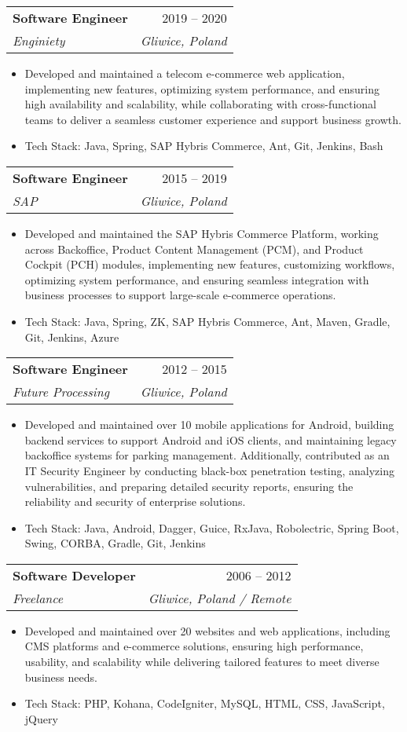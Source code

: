 \documentclass[letterpaper,11pt]{article}
\makeatletter
\newcommand{\resumeItem}[1]{
  \item\small{
    {#1 \vspace{-2pt}}
  }
}
\newcommand{\resumeSubheading}[4]{
  \vspace{-2pt}\item
    \begin{tabular*}{0.97\textwidth}[t]{l@{\extracolsep{\fill}}r}
      \textbf{#1} & #2 \\
      \textit{\small#3} & \textit{\small #4} \\
    \end{tabular*}\vspace{-7pt}
}
\newcommand{\resumeItemListStart}{\begin{itemize}}
\newcommand{\resumeItemListEnd}{\end{itemize}\vspace{-5pt}}
\makeatother
\begin{document}
    \resumeSubheading
      {Software Engineer}{2019 -- 2020}
      {Enginiety}{Gliwice, Poland}
      \resumeItemListStart
        \resumeItem{Developed and maintained a telecom e-commerce web application, implementing new features, optimizing system performance, and ensuring high availability and scalability, while collaborating with cross-functional teams to deliver a seamless customer experience and support business growth.}
        \resumeItem{Tech Stack: Java, Spring, SAP Hybris Commerce, Ant, Git, Jenkins, Bash}
    \resumeItemListEnd

    \resumeSubheading
      {Software Engineer}{2015 -- 2019}
      {SAP}{Gliwice, Poland}
      \resumeItemListStart
        \resumeItem{Developed and maintained the SAP Hybris Commerce Platform, working across Backoffice, Product Content Management (PCM), and Product Cockpit (PCH) modules, implementing new features, customizing workflows, optimizing system performance, and ensuring seamless integration with business processes to support large-scale e-commerce operations.}
        \resumeItem{Tech Stack: Java, Spring, ZK, SAP Hybris Commerce, Ant, Maven, Gradle, Git, Jenkins, Azure}
    \resumeItemListEnd

    \resumeSubheading
      {Software Engineer}{2012 -- 2015}
      {Future Processing}{Gliwice, Poland}
      \resumeItemListStart
        \resumeItem{Developed and maintained over 10 mobile applications for Android, building backend services to support Android and iOS clients, and maintaining legacy backoffice systems for parking management. Additionally, contributed as an IT Security Engineer by conducting black-box penetration testing, analyzing vulnerabilities, and preparing detailed security reports, ensuring the reliability and security of enterprise solutions.}
        \resumeItem{Tech Stack: Java, Android, Dagger, Guice, RxJava, Robolectric, Spring Boot, Swing, CORBA, Gradle, Git, Jenkins}
    \resumeItemListEnd

    \resumeSubheading
      {Software Developer}{2006 -- 2012}
      {Freelance}{Gliwice, Poland / Remote}
      \resumeItemListStart
        \resumeItem{Developed and maintained over 20 websites and web applications, including CMS platforms and e-commerce solutions, ensuring high performance, usability, and scalability while delivering tailored features to meet diverse business needs.}
        \resumeItem{Tech Stack: PHP, Kohana, CodeIgniter, MySQL, HTML, CSS, JavaScript, jQuery}
    \resumeItemListEnd

    \newpage
\end{document}
